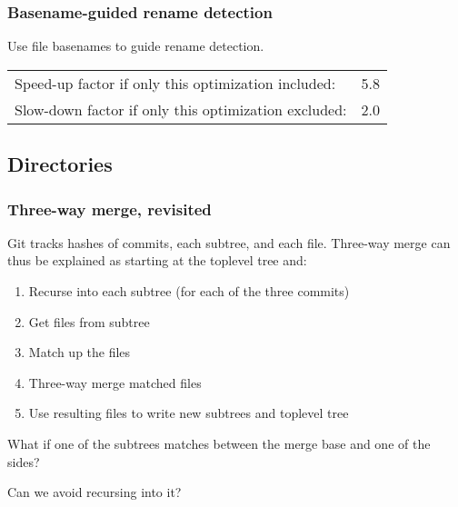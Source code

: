\documentclass[compress,t]{beamer}
\begin{document}
\begin{frame}
  \frametitle{Basename-guided rename detection}

  Use file basenames to guide rename detection.

  \pause
  \vspace*{\baselineskip}
  \begin{tabular}{lr}
    Speed-up factor if only this optimization included:  & 5.8 \\
    Slow-down factor if only this optimization excluded: & 2.0
  \end{tabular}

\end{frame}

\subsection{Directories}

\begin{frame}
  \frametitle{Three-way merge, revisited}

  Git tracks hashes of commits, each subtree, and each file.
  Three-way merge can thus be explained as starting at the toplevel
  tree and:
  
  \begin{enumerate}
    \item Recurse into each subtree (for each of the three commits)
    \item Get files from subtree
    \item Match up the files 
    \item Three-way merge matched files
    \item Use resulting files to write new subtrees and toplevel tree
  \end{enumerate}

  \pause
  \vspace*{\baselineskip}
  What if one of the subtrees matches between the merge base and one of the
  sides?

  \pause
  \vspace*{\baselineskip}
  Can we avoid recursing into it?

\end{frame}

\end{document}
